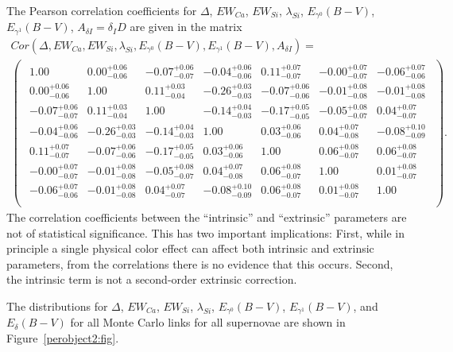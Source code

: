 \documentclass{aastex61}   	%
\begin{document}
The Pearson correlation coefficients for $\Delta$, $EW_{Ca}$, $EW_{Si}$, $\lambda_{Si}$, $E_{\gamma^0}(B-V)$, $E_{\gamma^1}(B-V)$,  $A_{\delta I}=\delta_I D$ are given in the matrix
\color{orange}
\begin{multline}
Cor(\Delta, EW_{Ca}, EW_{Si}, \lambda_{Si}, E_{\gamma^0}(B-V), E_{\gamma^1}(B-V),  A_{\delta I}) =\\
\begin{pmatrix}
\begin{array}{rrrrrrr}
1.00 & 0.00^{+0.06}_{-0.06} & -0.07^{+0.06}_{-0.07} & -0.04^{+0.06}_{-0.06} & 0.11^{+0.07}_{-0.07} & -0.00^{+0.07}_{-0.07} & -0.06^{+0.07}_{-0.06} \\
0.00^{+0.06}_{-0.06} & 1.00 & 0.11^{+0.03}_{-0.04} & -0.26^{+0.03}_{-0.03} & -0.07^{+0.06}_{-0.06} & -0.01^{+0.08}_{-0.08} & -0.01^{+0.08}_{-0.08} \\
-0.07^{+0.06}_{-0.07} & 0.11^{+0.03}_{-0.04} & 1.00 & -0.14^{+0.04}_{-0.03} & -0.17^{+0.05}_{-0.05} & -0.05^{+0.08}_{-0.07} & 0.04^{+0.07}_{-0.07} \\
-0.04^{+0.06}_{-0.06} & -0.26^{+0.03}_{-0.03} & -0.14^{+0.04}_{-0.03} & 1.00 & 0.03^{+0.06}_{-0.06} & 0.04^{+0.07}_{-0.08} & -0.08^{+0.10}_{-0.09} \\
0.11^{+0.07}_{-0.07} & -0.07^{+0.06}_{-0.06} & -0.17^{+0.05}_{-0.05} & 0.03^{+0.06}_{-0.06} & 1.00 & 0.06^{+0.08}_{-0.07} & 0.06^{+0.08}_{-0.07} \\
-0.00^{+0.07}_{-0.07} & -0.01^{+0.08}_{-0.08} & -0.05^{+0.08}_{-0.07} & 0.04^{+0.07}_{-0.08} & 0.06^{+0.08}_{-0.07} & 1.00 & 0.01^{+0.08}_{-0.07} \\
-0.06^{+0.07}_{-0.06} & -0.01^{+0.08}_{-0.08} & 0.04^{+0.07}_{-0.07} & -0.08^{+0.10}_{-0.09} & 0.06^{+0.08}_{-0.07} & 0.01^{+0.08}_{-0.07} & 1.00 \\
\end{array}
\end{pmatrix}.
\end{multline}
\color{black}
The correlation coefficients between the ``intrinsic'' and ``extrinsic'' parameters are
\color{orange}
not of statistical significance.
\color{black}
This has two important implications:
First, while in principle a single physical color effect can affect both intrinsic and extrinsic parameters, from the correlations
there is no evidence
that this occurs.
Second, the intrinsic term is not a second-order extrinsic correction.

The distributions for $\Delta$, $EW_{Ca}$, $EW_{Si}$, $\lambda_{Si}$, $E_{\gamma^0}(B-V)$, 
$E_{\gamma^1}(B-V)$, and
$E_{\delta}(B-V)$ for all Monte Carlo links for all supernovae are shown in Figure~\ref{perobject2:fig}.
\end{document}
